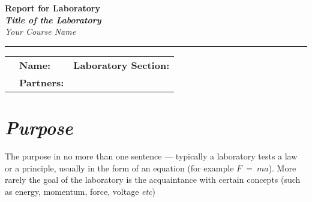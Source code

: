 \documentclass[epsfig,12pt]{article}
\begin{document}
\begin{center}
	\textbf{ \huge \color{RoyalBlue} Report for Laboratory \underline{\hskip 1cm}  }\\[2mm]
	\textbf{\textit{ \Large \color{VioletRed} Title of the Laboratory  }}\\[2mm]
	\textit{ \large \color{BlueViolet} Your Course Name  }
\end{center}
\hrule
\bigskip
\begin{tabularx}{\textwidth}{lXr}
%
	&
	\textbf{Name:}
	&
	\textbf{Laboratory Section:}
	\hspace{1.0cm}
	\\[2mm]
%
	&
	\textbf{Partners:}
\end{tabularx}
\medskip


\section*{\textit{Purpose}}

	The purpose in no more than one sentence --- typically a laboratory tests a law or a principle,
	usually in the form of an equation (for example $ F ~=~ m a $).
	More rarely the goal of the laboratory is the acquaintance with 
	certain concepts (such as energy, momentum, force, voltage \emph{etc})


\end{document}
